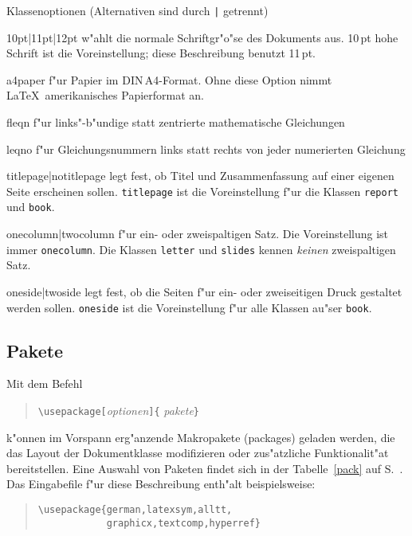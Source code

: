\begin{table}[hbpt]
\caption[Klassenoptionen]{Klassenoptionen (Alternativen sind durch \texttt{|}
  getrennt)} \label{options}
\oben{11cm}
\begin{ttdescription}%
\item [10pt|11pt|12pt] w"ahlt die normale Schriftgr"o"se des Dokuments aus.
  10\,pt hohe Schrift ist die Voreinstellung; diese Beschreibung benutzt 11\,pt.

\item[a4paper] f"ur Papier im DIN\,A4-Format. Ohne diese
  Option nimmt \LaTeX\ amerikanisches Papierformat an.
 
\item [fleqn] f"ur links"-b"undige statt zentrierte mathematische
  Gleichungen
 
\item [leqno] f"ur Gleichungsnummern links statt rechts von jeder
  numerierten Gleichung
 
\item [titlepage|notitlepage] legt fest, ob Titel und Zusammenfassung
  auf einer eigenen Seite erscheinen sollen.  \texttt{titlepage} ist
  die Voreinstellung f"ur die Klassen \texttt{report} und \texttt{book}.
 
\item [onecolumn|twocolumn] f"ur ein- oder zweispaltigen Satz.
 Die Voreinstellung ist immer \texttt{onecolumn}.  
 Die Klassen \texttt{letter} und \texttt{slides} kennen \emph{keinen}
 zweispaltigen Satz.
 
\item [oneside|twoside] legt fest, ob die Seiten f"ur ein- oder
  zweiseitigen  Druck gestaltet werden sollen.  
  \texttt{oneside} ist die Voreinstellung f"ur
  alle Klassen au"ser \texttt{book}.
  
\end{ttdescription}
\unten
\end{table}



\subsection{Pakete}\label{packages}
 
Mit dem Befehl
\begin{verse}
\verb:\usepackage[:\textit{optionen}\verb:]{:%
  \textit{pakete}\verb:}:
\end{verse}
k"onnen im Vorspann erg"anzende Makropakete (packages) geladen werden,
die das Layout der Dokumentklasse
modifizieren oder zus"atzliche Funktionalit"at bereitstellen.
Eine Auswahl von Paketen findet sich in der Tabelle~\ref{pack} 
auf S.~\pageref{pack}.
Das Eingabefile f"ur diese Beschreibung enth"alt beispielsweise:
\begin{verse}
\verb|\usepackage{german,latexsym,alltt,|\\
\verb|            graphicx,textcomp,hyperref}|
\end{verse}


